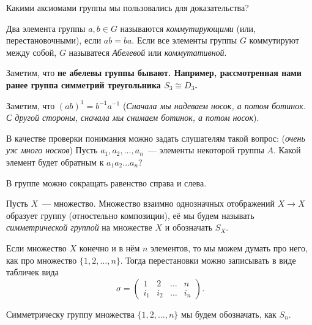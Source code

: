 	\begin{remark}
		Какими аксиомами группы мы пользовались для доказательства? 
	\end{remark}

	\begin{definition} 
		Два элемента группы $a, b \in G$ называются \emph{коммутирующими} (или, перестановочными), если $ab = ba$. Если все элементы группы $G$ коммутируют между собой, $G$ называтеся \emph{Абелевой} или \emph{коммутативной}. 
	\end{definition}

	\begin{remark}
		Заметим, что \bf{не абелевы} группы бывают. Например, рассмотренная нами ранее группа симметрий треугольника $S_{3} \cong D_{3}$.
	\end{remark}

	\begin{example}
		Заметим, что $(ab)^{1} = b^{-1}a^{-1}$ (\emph{Сначала мы надеваем носок, а потом ботинок. С другой  стороны, сначала мы снимаем ботинок, а потом носок}).

		В качестве проверки понимания можно задать слушателям такой вопрос:  (\emph{очень уж много носков}) Пусть $a_1, a_2, \ldots, a_n$~--- элементы некоторой группы $A$. Какой элемент будет обратным к $a_1 a_2 \ldots a_n$?
	\end{example}

	\begin{observation}
		В группе можно сокращать равенство справа и слева. 
	\end{observation}


	\begin{example}
		\begin{definition} 
		Пусть $X$~--- множество. Множество взаимно однозначных отображений $X \to X$ образует группу (отностельно композиции), её мы будем называть \emph{симметрической группой} на множестве $X$ и обозначать $S_{X}$. 
	\end{definition}

	\begin{remark}
		Если множество $X$ конечно и в нём $n$ элементов, то мы можем думать про него, как про множество $\{ 1, 2, \ldots, n \}$.  Тогда перестановки можно записывать в виде табличек вида 
		\[
			\sigma = \begin{pmatrix} 1 & 2 & \ldots & n \\ i_{1} & i_{2} & \ldots & i_{n} \end{pmatrix}.
		\]

		Симметрическу группу множества $\{ 1, 2, \ldots, n \}$ мы будем обозначать, как $S_{n}$.
	\end{remark}
	\end{example}

